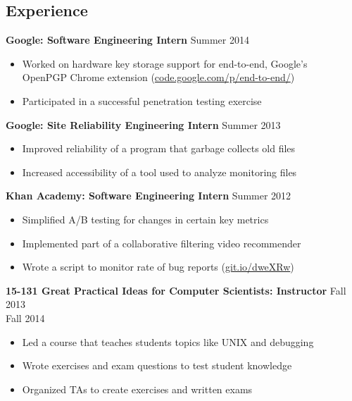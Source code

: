 \documentclass[margin]{res}
\begin{document}
\begin{resume}
\section{Experience}
  \textbf{Google: Software Engineering Intern} \hfill Summer 2014
  \begin{itemize} \itemsep -2pt  %
    \item Worked on hardware key storage support for end-to-end, Google's\\
      OpenPGP Chrome extension
      (\href{https://code.google.com/p/end-to-end/}{code.google.com/p/end-to-end/})
    \item Participated in a successful penetration testing exercise
  \end{itemize}
  \textbf{Google: Site Reliability Engineering Intern}
    \hfill Summer 2013
  \begin{itemize} \itemsep -2pt  %
    \item Improved reliability of a program that garbage collects old files
    \item Increased accessibility of a tool used to analyze monitoring files
  \end{itemize}

  \textbf{Khan Academy: Software Engineering Intern} \hfill Summer 2012
  \begin{itemize} \itemsep -2pt %
  \item Simplified A/B testing for changes in certain key metrics
  \item Implemented part of a collaborative filtering video recommender
  \item Wrote a script to monitor rate of bug reports
    (\href{https://github.com/Khan/beep-boop}{git.io/dweXRw})
  \end{itemize}

  \textbf{15-131 Great Practical Ideas for Computer Scientists: Instructor}
    \hfill Fall 2013 \\ \hphantom{1em} \hfill Fall 2014

  \vspace{-1em}\vspace{-1ex}
  \begin{itemize} \itemsep -2pt
    \item Led a course that teaches students topics like UNIX and debugging
    \item Wrote exercises and exam questions to test student knowledge
    \item Organized TAs to create exercises and written exams
  \end{itemize}


\end{resume}
\end{document}
